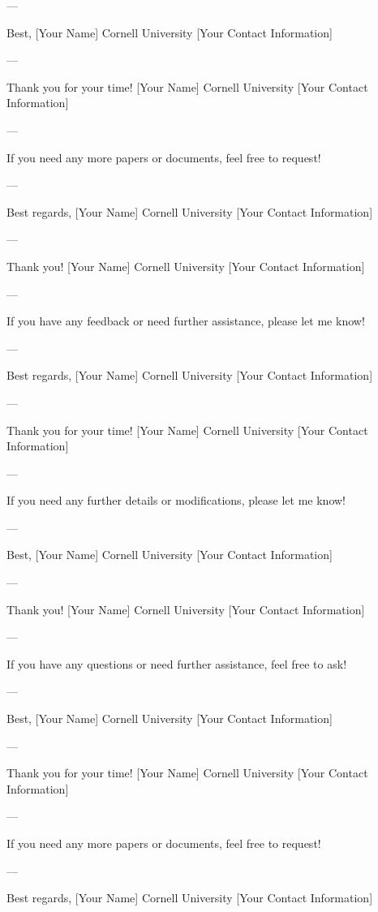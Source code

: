 --- 

Best,  
[Your Name]  
Cornell University  
[Your Contact Information]  

--- 

Thank you for your time!  
[Your Name]  
Cornell University  
[Your Contact Information]  

--- 

If you need any more papers or documents, feel free to request! 

--- 

Best regards,  
[Your Name]  
Cornell University  
[Your Contact Information]  

--- 

Thank you!  
[Your Name]  
Cornell University  
[Your Contact Information]  

--- 

If you have any feedback or need further assistance, please let me know! 

--- 

Best regards,  
[Your Name]  
Cornell University  
[Your Contact Information]  

--- 

Thank you for your time!  
[Your Name]  
Cornell University  
[Your Contact Information]  

--- 

If you need any further details or modifications, please let me know! 

--- 

Best,  
[Your Name]  
Cornell University  
[Your Contact Information]  

--- 

Thank you!  
[Your Name]  
Cornell University  
[Your Contact Information]  

--- 

If you have any questions or need further assistance, feel free to ask! 

--- 

Best,  
[Your Name]  
Cornell University  
[Your Contact Information]  

--- 

Thank you for your time!  
[Your Name]  
Cornell University  
[Your Contact Information]  

--- 

If you need any more papers or documents, feel free to request! 

--- 

Best regards,  
[Your Name]  
Cornell University  
[Your Contact Information]  

